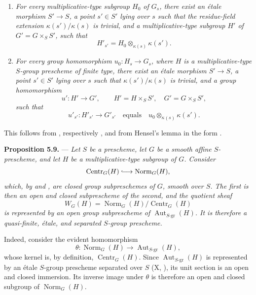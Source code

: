 \begin{enumerate}
\item[(a)] 
\textit{For every multiplicative-type subgroup \(H_0\) of \(G_s\),
there exist an étale morphism \(S'\to S\), a point \(s'\in S'\)
lying over \(s\) such that the residue-field extension
\(\kappa(s')/\kappa(s)\) is trivial, and a multiplicative-type
subgroup \(H'\) of \(G'=G\times_S S'\), such that}
\[
  H'_{s'}=H_0\otimes_{\kappa(s)}\kappa(s').
\]

\item[(b)] 
\textit{For every group homomorphism \(u_0:H_s\to G_s\), where
\(H\) is a multiplicative-type \(S\)-group prescheme of finite
type, there exist an étale morphism \(S'\to S\), a point \(s'\in S'\)
lying over \(s\) such that \(\kappa(s')/\kappa(s)\) is trivial, and
a group homomorphism
\[
  u':H'\longrightarrow G',
  \qquad
  H'=H\times_S S',
  \quad
  G'=G\times_S S',
\]
such that}
\[
  u'_{s'}:H'_{s'}\longrightarrow G'_{s'}
  \quad\text{equals}\quad
  u_0\otimes_{\kappa(s)}\kappa(s').
\]
\end{enumerate}

This follows from , respectively , and from Hensel's lemma in
the form .

\medskip
\noindent{}\textbf{Proposition 5.9.} ---
\textit{Let \(S\) be a prescheme, let \(G\) be a smooth affine
\(S\)-prescheme, and let \(H\) be a multiplicative-type subgroup of
\(G\).  Consider}
\[
  \operatorname{Centr}_G(H)\lhook\joinrel\longrightarrow
  \operatorname{Norm}_G(H),
\]
\textit{which, by  and , are closed group subpreschemes of
\(G\), smooth over \(S\).  The first is then an open and closed
subprescheme of the second, and the quotient sheaf}
\[
  W_G(H)=
  \operatorname{Norm}_G(H)\big/\operatorname{Centr}_G(H)
\]
\textit{is represented by an open group subprescheme of
\(\operatorname{Aut}_{S\text{-}\mathrm{gr}}(H)\).  It is therefore
a quasi-finite, étale, and separated \(S\)-group prescheme.}

Indeed, consider the evident homomorphism
\[
  \theta:\operatorname{Norm}_G(H)\longrightarrow
  \operatorname{Aut}_{S\text{-}\mathrm{gr}}(H),
\]
whose kernel is, by definition, \(\operatorname{Centr}_G(H)\).
Since \(\operatorname{Aut}_{S\text{-}\mathrm{gr}}(H)\) is
represented by an étale \(S\)-group prescheme separated over \(S\)
(X, ), its unit section is an open and closed immersion.  Its
inverse image under \(\theta\) is therefore an open and closed
subgroup of \(\operatorname{Norm}_G(H)\).

